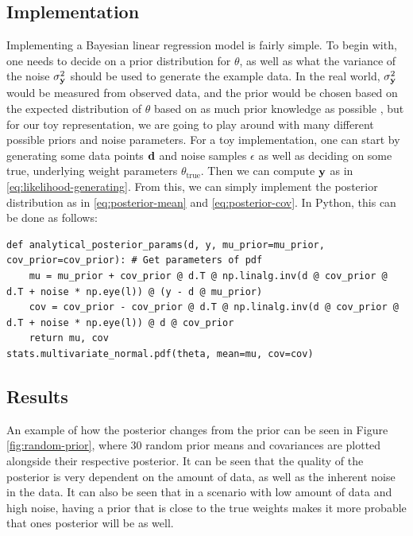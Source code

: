 \subsection{Implementation}
Implementing a Bayesian linear regression model is fairly simple.
To begin with, one needs to decide on a prior distribution for $\theta$, as well as what the variance of the noise $\sigma^2_{\mathbf{y}}$ should be used to generate the example data.
In the real world, $\sigma^2_{\mathbf{y}}$ would be measured from observed data, and the prior would be chosen based on the expected distribution of $\theta$ based on as much prior knowledge as possible
, but for our toy representation, we are going to play around with many different possible priors and noise parameters.
For a toy implementation, one can start by generating some data points $\mathbf{d}$ and noise samples $\epsilon$ as well as deciding on some true, underlying weight parameters $\theta_{\textrm{true}}$.
Then we can compute $\mathbf{y}$ as in \eqref{eq:likelihood-generating}. 
From this, we can simply implement the posterior distribution as in \eqref{eq:posterior-mean} and \eqref{eq:posterior-cov}.
In Python, this can be done as follows:
\begin{verbatim}
def analytical_posterior_params(d, y, mu_prior=mu_prior, cov_prior=cov_prior): # Get parameters of pdf
    mu = mu_prior + cov_prior @ d.T @ np.linalg.inv(d @ cov_prior @ d.T + noise * np.eye(l)) @ (y - d @ mu_prior)
    cov = cov_prior - cov_prior @ d.T @ np.linalg.inv(d @ cov_prior @ d.T + noise * np.eye(l)) @ d @ cov_prior
    return mu, cov
stats.multivariate_normal.pdf(theta, mean=mu, cov=cov)
\end{verbatim}

\subsection{Results}
An example of how the posterior changes from the prior can be seen in Figure \ref{fig:random-prior}, where 30 random prior means and covariances are plotted alongside their respective posterior.
It can be seen that the quality of the posterior is very dependent on the amount of data, as well as the inherent noise in the data.
It can also be seen that in a scenario with low amount of data and high noise, having a prior that is close to the true weights makes it more probable that ones posterior will be as well.

